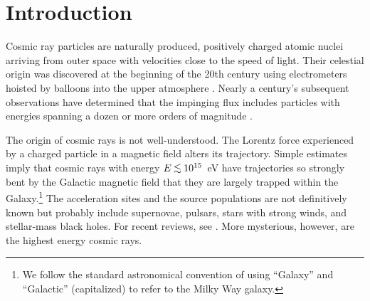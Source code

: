 \section{Introduction}

Cosmic ray particles are naturally produced, positively charged atomic nuclei
arriving from outer space with velocities close to the speed of light.  Their
celestial origin was discovered at the beginning of the 20th century using
electrometers hoisted by balloons into the upper atmosphere \cite{Hess12}. 
Nearly a century's subsequent observations have determined that the impinging
flux includes particles with energies spanning a dozen or more orders of
magnitude \cite{Cronin99}.

The origin of cosmic rays is not well-understood. The Lorentz force
experienced by a charged particle in a magnetic field alters its trajectory.
Simple estimates imply that cosmic rays with energy $E \lta 10^{15}$~eV 
have trajectories so strongly bent
by the Galactic magnetic field that they are largely trapped within the
Galaxy.\footnote{We follow the standard astronomical convention of using
``Galaxy'' and ``Galactic'' (capitalized) to refer to the Milky Way galaxy.}
The acceleration sites and the source populations are not definitively known
but probably include supernovae, pulsars, stars with strong winds, and
stellar-mass black holes.  For recent reviews, see \cite{Cronin99,Hillas06}.
More mysterious, however, are the highest energy cosmic rays.

